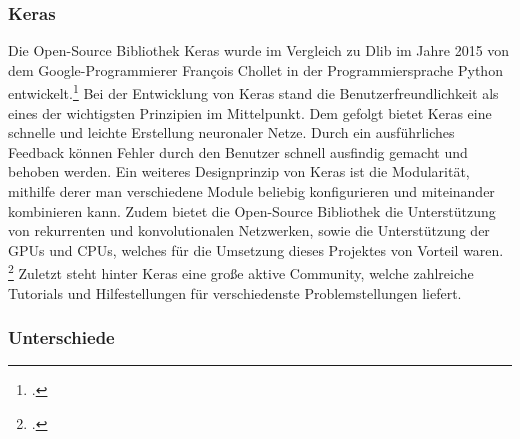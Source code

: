 \documentclass[12pt, a4paper]{report}
\begin{document}
\subsubsection{Keras}
Die Open-Source Bibliothek Keras wurde im Vergleich zu Dlib im Jahre 2015 von dem Google-Programmierer François Chollet in der Programmiersprache Python entwickelt.\footcite[Vgl.]{Keras}
Bei der Entwicklung von Keras stand die Benutzerfreundlichkeit als eines der wichtigsten Prinzipien im Mittelpunkt. Dem gefolgt bietet Keras eine schnelle und leichte Erstellung neuronaler Netze. Durch ein ausführliches Feedback können Fehler durch den Benutzer schnell ausfindig gemacht und behoben werden. Ein weiteres Designprinzip von Keras ist die Modularität, mithilfe derer man verschiedene Module beliebig konfigurieren und miteinander kombinieren kann. Zudem bietet die Open-Source Bibliothek die Unterstützung von rekurrenten und konvolutionalen Netzwerken, sowie die Unterstützung der GPUs und CPUs, welches für die Umsetzung dieses Projektes von Vorteil waren.
\footcite[Vgl.]{Keras2}
Zuletzt steht hinter Keras eine große aktive Community, welche zahlreiche Tutorials und Hilfestellungen für verschiedenste Problemstellungen liefert.


\subsubsection{Unterschiede}
\end{document}
